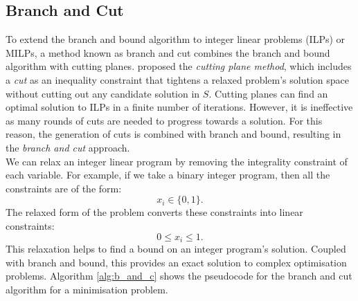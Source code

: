 \documentclass[mscthesis, 11pt]{usiinfthesis}
\theoremstyle{newdefinition}
\begin{document}
\subsection{Branch and Cut}
To extend the branch and bound algorithm to integer linear problems (ILPs) or MILPs, a method known as branch and cut combines the branch and bound algorithm with cutting planes. \cite{gomory_algorithm_1960} proposed the \emph{cutting plane method}, which includes a \emph{cut} as an inequality constraint that tightens a relaxed problem's solution space without cutting out any candidate solution in $S$.  Cutting planes can find an optimal solution to ILPs in a finite number of iterations. However, it is ineffective as many rounds of cuts are needed to progress towards a solution. For this reason, the generation of cuts is combined with branch and bound, resulting in the \emph{branch and cut} approach.\\
We can relax an integer linear program by removing the integrality constraint of each variable. For example, if we take a binary integer program, then all the constraints are of the form:
\begin{equation}
    x_i \in \{0,1\}.
\end{equation}
The relaxed form of the problem converts these constraints into linear constraints:
\begin{equation}
    0 \leq x_i \leq 1.
\end{equation}
This relaxation helps to find a bound on an integer program's solution. Coupled with branch and bound, this provides an exact solution to complex optimisation problems. Algorithm \ref{alg:b_and_c} shows the pseudocode for the branch and cut algorithm for a minimisation problem.
\end{document}
